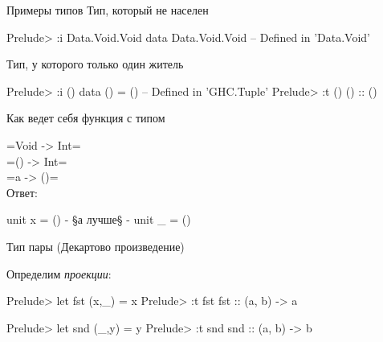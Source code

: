 \documentclass{beamer}
\begin{document}
\begin{frame}[fragile]{Примеры типов}
Тип, который не населен
\begin{hslisting}
Prelude> :i Data.Void.Void
data Data.Void.Void        -- Defined in 'Data.Void'
\end{hslisting}

Тип, у которого только один житель
\begin{hslisting}
Prelude> :i ()
data () = ()               -- Defined in 'GHC.Tuple'
Prelude> :t ()
() :: ()
\end{hslisting}
\end{frame}

\begin{frame}[fragile]{Как ведет себя функция с типом}

{\Large \faQuestion} \hsinline=Void -> Int= \\
\vspace{0.5cm}
{\Large \faQuestion} \hsinline=()  -> Int= \\
\vspace{0.5cm}
{\large \faQuestion} \hsinline=a -> ()= \\
\vspace{0.5cm}
\pause
Ответ:
\begin{hslisting}
unit x = ()
{- §а лучше§ -}
unit _ = ()
\end{hslisting}
\end{frame}

\begin{frame}[fragile]{Тип пары (Декартово произведение)}
\begin{center}
\end{center}
\pause
Определим \textit{проекции}:
\begin{hslisting}
Prelude> let fst (x,_) = x
Prelude> :t fst
fst :: (a, b) -> a

Prelude> let snd (_,y) = y
Prelude> :t snd
snd :: (a, b) -> b
\end{hslisting}

\end{frame}
\end{document}
